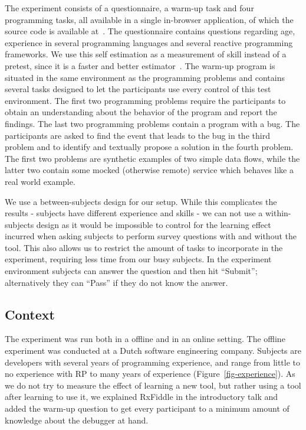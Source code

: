 The experiment consists of a questionnaire, a warm-up task and four
programming tasks, all available in a single in-browser application, of
which the source code is available at~\cite{rxfiddle-doi}.  The
questionnaire contains questions regarding age, experience in several
programming languages and several reactive programming frameworks.  We
use this self estimation as a measurement of skill instead of a pretest,
since it is a faster and better estimator~\cite{kleinschmager2011rate,feigenspan2012measuring,siegmund2014measuring}.
The warm-up program is situated in the same environment as the
programming problems and contains several tasks designed to let the
participants use every control of this test environment.  The first two
programming problems require the participants to obtain an understanding
about the behavior of the program and report the findings.  The last two
programming problems contain a program with a bug.  The participants are
asked to find the event that leads to the bug in the third problem and
to identify and textually propose a solution in the fourth problem.  The
first two problems are synthetic examples of two simple data flows,
while the latter two contain some mocked (otherwise remote) service which
behaves like a real world example.

We use a between-subjects design for our setup.  While this complicates
the results - subjects have different experience and skills - we can not
use a within-subjects design as it would be impossible to control for
the learning effect incurred when asking subjects to perform survey
questions with and without the tool.  This also allows us to restrict
the amount of tasks to incorporate in the experiment, requiring less
time from our busy subjects.  In the experiment environment subjects can
answer the question and then hit ``Submit''; alternatively they can
``Pass'' if they do not know the answer.

\subsection{Context} The experiment was run both in a offline and in an
online setting.  The offline experiment was conducted at a Dutch
software engineering company.  Subjects are developers with several
years of programming experience, and range from little to no experience
with RP to many years of experience (Figure~\ref{fig-experience}).  
As we do not try to measure the effect of
learning a new tool, but rather using a tool after learning to use it,
we explained RxFiddle in the introductory talk and added the warm-up
question to get every participant to a minimum amount of knowledge about
the debugger at hand.

